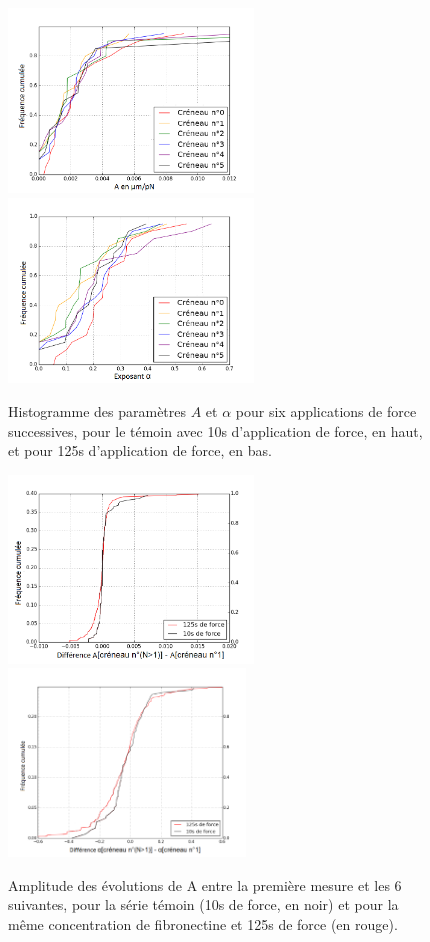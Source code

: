 \begin{center}
\begin{figure}[p]
\includegraphics[width=6.5cm]{Figures/A_creneaux_S2.png} 
\includegraphics[width=6.5cm]{Figures/E_creneaux_S2.png} 
\caption{\label{Evolution_6c} Histogramme des paramètres $A$ et $\alpha$ pour six applications de force successives, pour le témoin avec 10s d’application de force, en haut, et pour 125s d’application de force, en bas.}
\end{figure}
\end{center}
\begin{figure}
\includegraphics[height=5cm]{Figures/A_diff_seul.png} 
\includegraphics[height=5cm]{Figures/E_diff_seul.png}
\caption{Amplitude des évolutions de A entre la première mesure et les 6 suivantes, pour la série témoin (10s de force, en noir) et pour la même concentration de fibronectine et 125s de force (en rouge).}
\label{Diff}
\end{figure}

